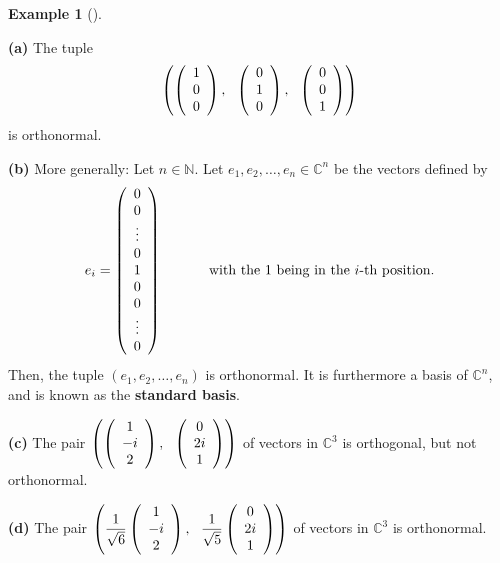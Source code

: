 \documentclass[numbers=enddot,12pt,final,onecolumn,notitlepage]{scrartcl}%
\numberwithin{exer}{subsection}
\theoremstyle{definition}
\newtheorem{exam}[theo]{Example}
\newenvironment{example}[1][]
{\begin{exam}[#1]\begin{leftbar}}
{\end{leftbar}\end{exam}}
\begin{document}
\begin{example}
\textbf{(a)} The tuple%
\[
\left(  \left(
\begin{array}
[c]{c}%
1\\
0\\
0
\end{array}
\right)  ,\ \ \left(
\begin{array}
[c]{c}%
0\\
1\\
0
\end{array}
\right)  ,\ \ \left(
\begin{array}
[c]{c}%
0\\
0\\
1
\end{array}
\right)  \right)
\]
is orthonormal.

\textbf{(b)} More generally: Let $n\in\mathbb{N}$. Let $e_{1},e_{2}%
,\ldots,e_{n}\in\mathbb{C}^{n}$ be the vectors defined by%
\[
e_{i}=\left(
\begin{array}
[c]{c}%
0\\
0\\
\vdots\\
0\\
1\\
0\\
0\\
\vdots\\
0
\end{array}
\right)  \ \ \ \ \ \ \ \ \ \ \text{with the }1\text{ being in the }i\text{-th
position.}%
\]
Then, the tuple $\left(  e_{1},e_{2},\ldots,e_{n}\right)  $ is orthonormal. It
is furthermore a basis of $\mathbb{C}^{n}$, and is known as the
\textbf{standard basis}.

\textbf{(c)} The pair $\left(  \left(
\begin{array}
[c]{c}%
1\\
-i\\
2
\end{array}
\right)  ,\ \ \left(
\begin{array}
[c]{c}%
0\\
2i\\
1
\end{array}
\right)  \right)  $ of vectors in $\mathbb{C}^{3}$ is orthogonal, but not orthonormal.

\textbf{(d)} The pair $\left(  \dfrac{1}{\sqrt{6}}\left(
\begin{array}
[c]{c}%
1\\
-i\\
2
\end{array}
\right)  ,\ \ \dfrac{1}{\sqrt{5}}\left(
\begin{array}
[c]{c}%
0\\
2i\\
1
\end{array}
\right)  \right)  $ of vectors in $\mathbb{C}^{3}$ is orthonormal.
\end{example}
\end{document}
